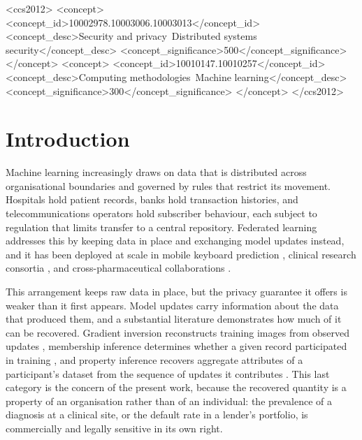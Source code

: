 \documentclass[acmsmall,screen,review,anonymous]{acmart}
\theoremstyle{acmdefinition}%
\begin{document}
\begin{CCSXML}
<ccs2012>
   <concept>
       <concept_id>10002978.10003006.10003013</concept_id>
       <concept_desc>Security and privacy~Distributed systems security</concept_desc>
       <concept_significance>500</concept_significance>
       </concept>
   <concept>
       <concept_id>10010147.10010257</concept_id>
       <concept_desc>Computing methodologies~Machine learning</concept_desc>
       <concept_significance>300</concept_significance>
       </concept>
 </ccs2012>
\end{CCSXML}



\maketitle

\section{Introduction}
\label{sec:intro}

Machine learning increasingly draws on data that is distributed
across organisational boundaries and governed by rules that restrict its
movement. Hospitals hold patient records, banks hold transaction histories, and
telecommunications operators hold subscriber behaviour, each subject to
regulation that limits transfer to a central repository. Federated learning
\cite{mcmahan2017fedavg} addresses this by keeping data in place and exchanging
model updates instead, and it has been deployed at scale in mobile keyboard
prediction \cite{hard2018keyboard}, clinical research consortia
\cite{sheller2020federated,dayan2021federated}, and cross-pharmaceutical
collaborations \cite{heyndrickx2023melloddy}.

This arrangement keeps raw data in place, but the privacy guarantee it offers is weaker
than it first appears. Model updates carry information about the data that produced them, and a
substantial literature demonstrates how much of it can be recovered. Gradient
inversion reconstructs training images from observed updates
\cite{zhu2019dlg,geiping2020inverting}, membership inference determines whether a
given record participated in training \cite{shokri2017membership}, and property
inference recovers aggregate attributes of a participant's dataset from the
sequence of updates it contributes \cite{melis2019exploiting}. This last category
is the concern of the present work, because the recovered quantity is a property
of an organisation rather than of an individual: the prevalence of a diagnosis at
a clinical site, or the default rate in a lender's portfolio, is commercially and
legally sensitive in its own right.
\end{document}
